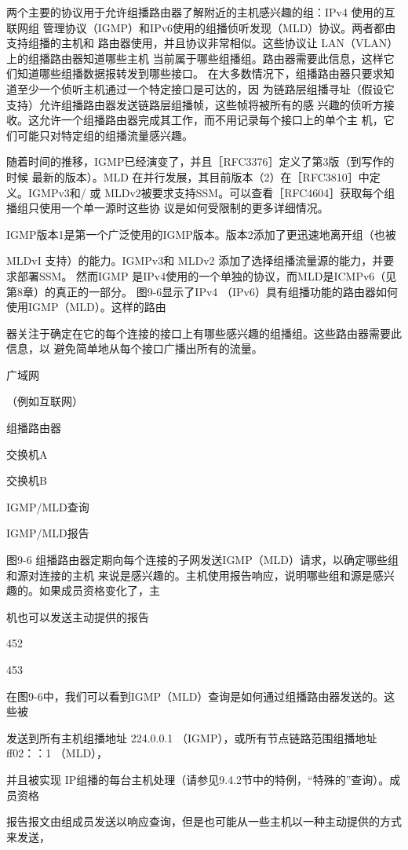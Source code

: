 两个主要的协议用于允许组播路由器了解附近的主机感兴趣的组：IPv4 使用的互联网组
管理协议（IGMP）和IPv6使用的组播侦听发现（MLD）协议。两者都由支持组播的主机和
路由器使用，并且协议非常相似。这些协议让 LAN（VLAN）上的组播路由器知道哪些主机
当前属于哪些组播组。路由器需要此信息，这样它们知道哪些组播数据报转发到哪些接口。
在大多数情况下，组播路由器只要求知道至少一个侦听主机通过一个特定接口是可达的，因
为链路层组播寻址（假设它支持）允许组播路由器发送链路层组播帧，这些帧将被所有的感
兴趣的侦听方接收。这允许一个组播路由器完成其工作，而不用记录每个接口上的单个主
机，它们可能只对特定组的组播流量感兴趣。

随着时间的推移，IGMP已经演变了，并且［RFC3376］定义了第3版（到写作的时候
最新的版本）。MLD 在并行发展，其目前版本（2）在［RFC3810］中定义。IGMPv3和/ 或
MLDv2被要求支持SSM。可以查看［RFC4604］获取每个组播组只使用一个单一源时这些协
议是如何受限制的更多详细情况。

IGMP版本1是第一个广泛使用的IGMP版本。版本2添加了更迅速地离开组（也被

MLDvI 支持）的能力。IGMPv3和 MLDv2 添加了选择组播流量源的能力，并要求部署SSM。
然而IGMP 是IPv4使用的一个单独的协议，而MLD是ICMPv6（见第8章）的真正的一部分。
图9-6显示了IPv4 （IPv6）具有组播功能的路由器如何使用IGMP（MLD）。这样的路由

器关注于确定在它的每个连接的接口上有哪些感兴趣的组播组。这些路由器需要此信息，以
避免简单地从每个接口广播出所有的流量。

广域网

（例如互联网）

组播路由器

交换机A

交换机B

IGMP/MLD查询

IGMP/MLD报告

图9-6 组播路由器定期向每个连接的子网发送IGMP（MLD）请求，以确定哪些组和源对连接的主机
来说是感兴趣的。主机使用报告响应，说明哪些组和源是感兴趣的。如果成员资格变化了，主

机也可以发送主动提供的报告

452

453

在图9-6中，我们可以看到IGMP（MLD）查询是如何通过组播路由器发送的。这些被

发送到所有主机组播地址 224.0.0.1 （IGMP），或所有节点链路范围组播地址 ff02：：1 （MLD），

并且被实现 IP组播的每台主机处理（请参见9.4.2节中的特例，“特殊的”查询）。成员资格

报告报文由组成员发送以响应查询，但是也可能从一些主机以一种主动提供的方式来发送，

